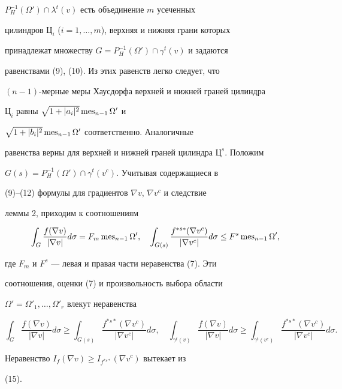 $P^{-1}_H(\Omega')\cap\lambda^t(v)$ есть объединение $m$ усеченных 


цилиндров $Ц_i$ ($i=1,\dotsc,m$), верхняя и нижняя грани которых 


принадлежат множеству $G=P^{-1}_H(\Omega')\cap\gamma^t(v)$ и задаются 


равенствами (9), (10). Из этих равенств легко следует, что 


$(n-1)$-мерные меры Хаусдорфа верхней и нижней граней цилиндра 


$Ц_i$ равны $\sqrt{1+|a_i|^2}\operatorname{mes}_{n-1}\Omega'$ и 


$\sqrt{1+|b_i|^2}\operatorname{mes}_{n-1}\Omega'$ соответственно. Аналогичные 


равенства верны для верхней и нижней граней цилиндра $Ц^s$. Положим 


$G(s)=P^{-1}_H(\Omega')\cap\gamma^t(v^c)$. Учитывая содержащиеся в 


(9)--(12) формулы для градиентов $\nabla v$, $\nabla v^c$ и следствие 


леммы 2, приходим к соотношениям 


$$ 


\int_G\frac{f(\nabla v)}{|\nabla v|}d\sigma= F_m\mes_{n-1} 


\Omega',\quad 


\int_{G(s)}\frac{f^{*s*}(\nabla v^c)}{|\nabla v^c|}d\sigma\le 


F^s\mes_{n-1}\Omega', 


$$ 


где $F_m$ и $F^s$ --- левая и правая части неравенства (7). Эти 


соотношения, оценки (7) и произвольность выбора области 


$\Omega'=\Omega'_1,\dotsc,\Omega'_r$ влекут неравенства 


$$ 


\int_G\frac{f(\nabla v)}{|\nabla v|}d\sigma\ge 


\int_{G(s)}\frac{f^{*s*}(\nabla v^c)}{|\nabla v^c|}d\sigma,\quad 


\int_{\gamma^t(v)}\frac{f(\nabla v)}{|\nabla v|}d\sigma\ge 


\int_{\gamma^t(v^c)} 


\frac{f^{*s*}(\nabla v^c)}{|\nabla v^c|}d\sigma. 


$$ 


Неравенство $I_f(\nabla v)\ge I_{f^{*s*}}(\nabla v^c)$ вытекает из 


(15). 


